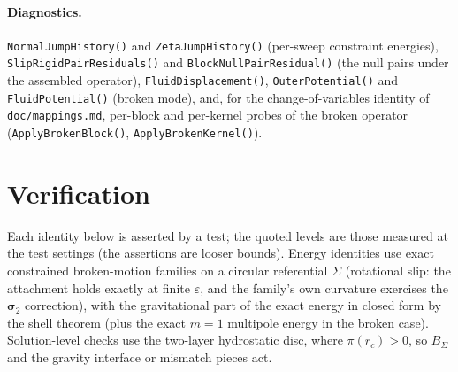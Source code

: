 \documentclass[11pt]{article}
\newcommand{\eps}{\varepsilon}
\begin{document}
\paragraph{Diagnostics.} \texttt{NormalJumpHistory()} and
\texttt{ZetaJumpHistory()} (per-sweep constraint energies),
\texttt{SlipRigidPairResiduals()} and \texttt{BlockNullPairResidual()}
(the null pairs under the assembled operator),
\texttt{FluidDisplacement()}, \texttt{OuterPotential()} and
\texttt{FluidPotential()} (broken mode), and, for the change-of-variables
identity of \texttt{doc/mappings.md}, per-block and per-kernel probes of
the broken operator (\texttt{ApplyBrokenBlock()},
\texttt{ApplyBrokenKernel()}).

\section{Verification}
\label{sec:verif}

Each identity below is asserted by a test; the quoted levels are those
measured at the test settings (the assertions are looser bounds).
Energy identities use exact constrained broken-motion families on a
circular referential $\Sigma$ (rotational slip: the attachment holds
exactly at finite $\eps$, and the family's own curvature exercises the
$\bm{\sigma}_2$ correction), with the gravitational part of the exact
energy in closed form by the shell theorem (plus the exact $m = 1$
multipole energy in the broken case). Solution-level checks use the
two-layer hydrostatic disc, where $\pi(r_c) > 0$, so $B_\Sigma$ and the
gravity interface or mismatch pieces act.
\end{document}
